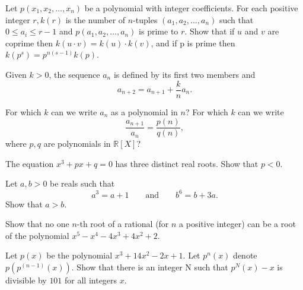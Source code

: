\documentclass[12pt,a4paper]{memoir}
\theoremstyle{definition}
\begin{document}
\begin{question}[name={1987 Brazil}]
	Let $p(x_1, x_2, \dots , x_n)$ be a polynomial with integer coefficients. For each positive integer $r, k(r)$ is the number of $n$-tuples $(a_1, a_2,\dots , a_n)$ such that $0 \le a_i  \le r-1 $ and $p(a_1, a_2, \dots , a_n)$ is prime to $r$. Show that if $u$ and $v$ are coprime then $k(u\cdot v) = k(u)\cdot  k(v)$, and if p is prime then $k(p^s) = p^{n(s-1)} k(p)$.
\end{question}


\begin{question}[name={1991 Brazil}]
	Given $k > 0$, the sequence $a_n$ is defined by its first two members and \[ a_{n+2} = a_{n+1} + \frac{k}{n}a_n.\]
	\begin{tasks}
		\task For which $k$ can we write $a_n$ as a polynomial in $n$?
		\task For which $k$ can we write \[\frac{a_{n+1}}{a_n} = \frac{p(n)}{q(n)},\] where $p,q$ are polynomials in $\mathbb R[X]$?
	\end{tasks}
\end{question}


\begin{question}[name={1992 Brazil}]
	The equation $x^3+px+q=0$ has three distinct real roots. Show that $p<0$.
\end{question}


\begin{question}[name={1994 Brazil}]
	Let $a, b > 0$ be reals such that
	\[ a^3=a+1 \qquad \text{and} \qquad  b^6=b+3a.  \]
	Show that $a>b$.
\end{question}


\begin{question}[name={1994 Brazil}]
	Show that no one $n$-th root of a rational (for $n$ a positive integer) can be a root of the polynomial $x^5 - x^4 - 4x^3 + 4x^2 + 2$.
\end{question}

\begin{question}[name={1996 Brazil}]
	Let $p(x)$ be the polynomial $x^3 + 14x^2 - 2x + 1$. Let $p^n(x)$ denote $p(p^(n-1)(x))$. Show that there is an integer N such that $p^N(x) - x$ is divisible by $101$ for all integers $x$.
\end{question}
\end{document}
